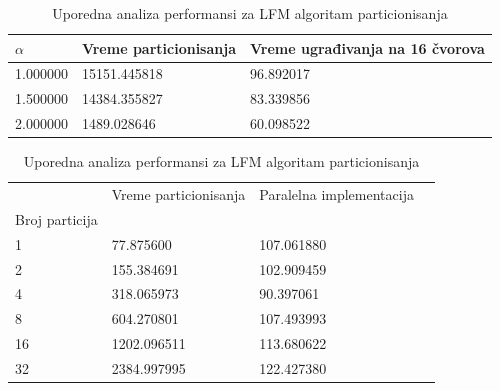 \documentclass{beamer}
\begin{document}
\begin{frame}
\begin{table}
\caption{Uporedna analiza performansi za LFM algoritam particionisanja}
\label{tab:Performance_comparison_max_Node2Vec_vs_modified__lfm_on_SBM_10M_with_varying_alpha}
\begin{tabular}{p{1in}p{1in}p{1in}}
\hline
$\alpha$  & Vreme particionisanja & Vreme ugrađivanja na 16 čvorova \\
\hline
1.000000 & 15151.445818 & 96.892017 \\
1.500000 & 14384.355827 & 83.339856 \\
2.000000 & 1489.028646 & 60.098522 \\
\hline
\end{tabular}
\end{table}
    
\end{frame}

\begin{frame}
\begin{table}
    
\caption{Uporedna analiza performansi za LFM algoritam particionisanja}
\label{tab:Performance_comparison_max_Node2Vec_vs_lfm_on_SBM_10M_with_varying_partition_num}
\begin{tabular}{p{1in}p{1in}p{1in}p{1in}}
\hline
 & Vreme particionisanja & Paralelna implementacija \\
Broj particija &  &  &  \\
\hline
1 & 77.875600 & 107.061880  \\
2 & 155.384691 & 102.909459 \\
4 & 318.065973 & 90.397061 \\
8 & 604.270801 & 107.493993 \\
16 & 1202.096511 & 113.680622 \\
32 & 2384.997995 & 122.427380 \\
\hline
\end{tabular}
\end{table}
\end{frame}
\end{document}
